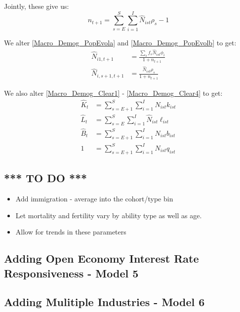 \documentclass[letterpaper,12pt]{article}
\theoremstyle{definition}
\numberwithin{equation}{section}
\begin{document}
\begin{spacing}{1.5}
    Jointly, these give us:
    \begin{equation}
    n_{t+1} = \sum_{s=E}^S \sum_{i=1}^I \hat N_{ist} \rho_s - 1
    \end{equation}

    We alter \eqref{Macro_Demog_PopEvola} and \eqref{Macro_Demog_PopEvolb} to get:
    \begin{align} 
    \hat N_{i1,t+1} & = \frac{\sum_s f_s \hat N_{ist} \phi_i}{1+n_{t+1}} \label{Macro_Demog_PopEvol2a}\\
    \hat N_{i,s+1,t+1} & = \frac{\hat N_{ist} \rho_s}{1+n_{t+1}} \label{Macro_Demog_PopEvol2b}
    \end{align}

    We also alter \eqref{Macro_Demog_Clear1} - \eqref{Macro_Demog_Clear4} to get:
    \begin{align}
    \hat K_t & = \sum_{s=E+1}^S \sum_{i=1}^I \hat N_{ist} k_{ist} \label{Macro_Demog_Khat}\\
    \hat L_t & = \sum_{s=E}^S \sum_{i=1}^I \hat N_{ist} \ell_{ist} \label{Macro_Demog_Lhat}\\
    \hat B_t & = \sum_{s=E+1}^S \sum_{i=1}^I \hat N_{ist} b_{ist} \label{Macro_Demog_Bhat}\\
    1 & = \sum_{s=E+1}^S \sum_{i=1}^I \hat N_{ist} q_{ist} \label{Macro_Demog_q}
    \end{align}




    \subsection{*** TO DO ***}
    \begin{itemize}
    \item Add immigration - average into the cohort/type bin
    \item Let mortality and fertility vary by ability type as well as age.
    \item Allow for trends in these parameters
    \end{itemize}

  \newpage


  \subsection{Adding Open Economy Interest Rate Responsiveness - Model 5}\label{SubSec_Macro_Open}

  \subsection{Adding Mulitiple Industries - Model 6}\label{SubSec_Macro_Multi}


\end{spacing}
\end{document}
